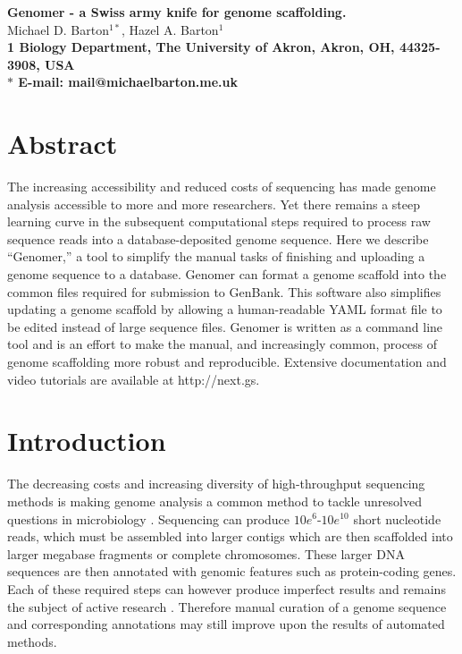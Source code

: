 \documentclass[10pt]{article}
\date{}
\begin{document}
\begin{flushleft}
{\Large
\textbf{Genomer - a Swiss army knife for genome scaffolding.}
}
\\
Michael D. Barton$^{1\ast}$, 
Hazel A. Barton$^{1}$
\\
\bf{1} Biology Department, The University of Akron, Akron, OH, 44325-3908, USA
\\
$\ast$ E-mail: mail@michaelbarton.me.uk
\end{flushleft}

\section*{Abstract}

The increasing accessibility and reduced costs of sequencing has made genome
analysis accessible to more and more researchers. Yet there remains a steep
learning curve in the subsequent computational steps required to process raw
sequence reads into a database-deposited genome sequence. Here we describe
``Genomer,'' a tool to simplify the manual tasks of finishing and uploading a
genome sequence to a database. Genomer can format a genome scaffold into the
common files required for submission to GenBank. This software also simplifies
updating a genome scaffold by allowing a human-readable YAML format file to be
edited instead of large sequence files. Genomer is written as a command line
tool and is an effort to make the manual, and increasingly common, process of
genome scaffolding more robust and reproducible. Extensive documentation and
video tutorials are available at http://next.gs.

\section*{Introduction}

The decreasing costs and increasing diversity of high-throughput sequencing
methods is making genome analysis a common method to tackle unresolved
questions in microbiology \cite{loman2012b}. Sequencing can produce
$10e^{6}$-$10e^{10}$ short nucleotide reads, which must be assembled into
larger contigs which are then scaffolded into larger megabase fragments or
complete chromosomes. These larger DNA sequences are then annotated with
genomic features such as protein-coding genes. Each of these required steps can
however produce imperfect results and remains the subject of active research
\cite{earl2011,quail2012,beckloff2012}. Therefore manual curation of a genome
sequence and corresponding annotations may still improve upon the results of
automated methods.
\end{document}
